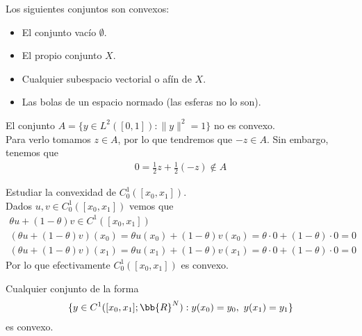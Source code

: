 \begin{observacion}
    Los siguientes conjuntos son convexos:
    \begin{itemize}
        \item El conjunto vacío $\emptyset$.
        \item El propio conjunto $X$.
        \item Cualquier subespacio vectorial o afín de $X$.
        \item Las bolas de un espacio normado (las esferas no lo son).
    \end{itemize}
\end{observacion}

\begin{ejemplo}
    El conjunto $A=\{y\in L^2([0,1]): \|y\|^2=1\}$ no es convexo.\\
    
    Para verlo tomamos $z\in A$, por lo que tendremos que $-z\in A$. Sin embargo, tenemos que 
    \begin{gather*}
        0 = \frac{1}{2}z + \frac{1}{2}(-z) \notin A
    \end{gather*}
\end{ejemplo}

\begin{ejemplo}
    Estudiar la convexidad de $C_0^1([x_0, x_1])$.\\

    Dados $u,v\in C_0^1([x_0, x_1])$ vemos que 
    \begin{gather*}
        \theta u + (1-\theta)v \in C^1([x_0, x_1])\\
        (\theta u + (1-\theta)v)(x_0) = \theta u(x_0) + (1-\theta)v(x_0) = \theta \cdot 0 + (1-\theta) \cdot 0 = 0\\
        (\theta u + (1-\theta)v)(x_1) = \theta u(x_1) + (1-\theta)v(x_1) = \theta \cdot 0 + (1-\theta) \cdot 0 = 0
    \end{gather*}
    Por lo que efectivamente $C_0^1([x_0, x_1])$ es convexo.
\end{ejemplo}

\begin{observacion}
    Cualquier conjunto de la forma
    \begin{gather*}
        \{y\in C^1([x_0, x_1];\bb{R}^N) : y(x_0) = y_0,\ y(x_1) = y_1\}
    \end{gather*}
    es convexo.
\end{observacion}

